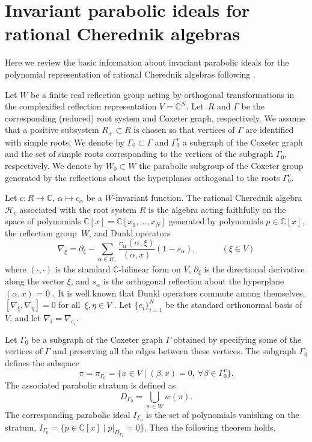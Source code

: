\documentclass[12pt]{amsart}
\newcommand{\C}{\mathbb C}
\newcommand{\cH}{\mathcal{H}}
\numberwithin{equation}{section}
\theoremstyle{definition}
\begin{document}
\section{Invariant parabolic ideals for rational Cherednik algebras}\label{invariant ideals}
Here we review the basic information about invariant parabolic ideals for the polynomial
representation of rational Cherednik algebras following \cite{Feigin}. 

Let $W$ be a finite real
reflection group acting by orthogonal transformations in the complexified reflection 
representation $V = \mathbb{C}^N$. Let~$R$ and $\Gamma$ be the corresponding (reduced) root system and
Coxeter graph, respectively. We assume that a positive subsystem $R_{+} \subset R$ is 
chosen so that vertices of $\Gamma$ are identified with simple roots.
We denote by $\Gamma_0 \subset \Gamma$ and $\Gamma_0^v$ a subgraph of the Coxeter graph and the 
set of simple roots corresponding to the vertices of the subgraph $\Gamma_0$, respectively. We denote by $W_0 \subset W$ the parabolic subgroup of the Coxeter group generated by the reflections about the hyperplanes orthogonal to the roots $\Gamma_0^v$.

Let $c \colon R \to \C$, $\alpha \mapsto c_{\alpha}$ be a $W$-invariant function.  
The rational Cherednik
algebra $\cH_c$ associated with the root system $R$ is the algebra acting faithfully on the space of polynomials
$\mathbb{C}[x] = \mathbb{C}[x_1, \ldots, x_N]$ generated by polynomials $p \in \mathbb{C}[x]$, the reflection group~$W$, and Dunkl operators
\begin{equation}
    \label{Dunkl}
    \nabla_{\xi} = \partial_{\xi} - \sum\limits_{\alpha \in R_{+}} \frac{c_{\alpha} (\alpha, \xi)}{(\alpha, x)}(1 - s_{\alpha}), \qquad \quad (\xi \in V)
\end{equation}
where $(\cdot, \cdot)$ is the standard $\C$-bilinear form on $V$, $\partial_\xi$ is the directional derivative along the vector $\xi$, and $s_\alpha$ is the orthogonal reflection about the hyperplane $(\alpha, x)$ = 0 \cite{EG}.
It is well known that Dunkl operators commute among themselves, $[\nabla_{\xi} , \nabla_{\eta}] = 0$ for all~$\xi, \eta \in V$ \cite{Dunkl}. Let $\{e_i\}_{i=1}^N$ be the standard orthonormal basis of $V$, and let $\nabla_i = \nabla_{e_i}$.

Let $\Gamma_0$ be a subgraph of the Coxeter graph $\Gamma$ obtained by
specifying some of the vertices of $\Gamma$ and preserving all the edges between these vertices.
The subgraph $\Gamma_0$ defines the subspace
\begin{equation*}
    \pi = \pi_{\Gamma_0} = \{x \in V \mid (\beta , x)=0, \ \forall \beta \in \Gamma_0^v \}.
\end{equation*}
The associated parabolic stratum is defined as 
\begin{equation*}
    D_{\Gamma_0} = \bigcup\limits_{w \in W} w(\pi).
\end{equation*}
The corresponding parabolic ideal $I_{\Gamma_0}$ is the set of polynomials vanishing on the stratum,
$I_{\Gamma_0} = \{p \in \mathbb{C}[x] \mid p|_{D_{\Gamma_0}} = 0 \}$. Then the following theorem
holds.
\end{document}
